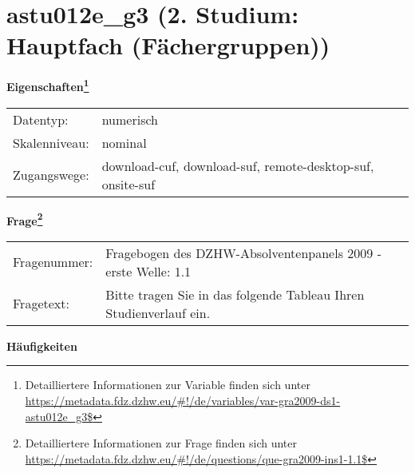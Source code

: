
    \setcounter{footnote}{0}

    \vspace*{-1.8cm}
	\section{astu012e\_g3 (2. Studium: Hauptfach (Fächergruppen))}
	\label{section:astu012e_g3}



    \vspace*{0.5cm}
    \noindent\textbf{Eigenschaften\footnote{Detailliertere Informationen zur Variable finden sich unter
		\url{https://metadata.fdz.dzhw.eu/\#!/de/variables/var-gra2009-ds1-astu012e_g3$}}}\\
	\begin{tabularx}{\hsize}{@{}lX}
	Datentyp: & numerisch \\
	Skalenniveau: & nominal \\
	Zugangswege: &
	  download-cuf, 
	  download-suf, 
	  remote-desktop-suf, 
	  onsite-suf
 \\
    \end{tabularx}



				\vspace*{0.5cm}
                \noindent\textbf{Frage\footnote{Detailliertere Informationen zur Frage finden sich unter
		              \url{https://metadata.fdz.dzhw.eu/\#!/de/questions/que-gra2009-ins1-1.1$}}}\\
				\begin{tabularx}{\hsize}{@{}lX}
					Fragenummer: &
					  Fragebogen des DZHW-Absolventenpanels 2009 - erste Welle:
					  1.1
 \\
					Fragetext: & Bitte tragen Sie in das folgende Tableau Ihren Studienverlauf ein. \\
				\end{tabularx}





        		\vspace*{0.5cm}
                \noindent\textbf{Häufigkeiten}

